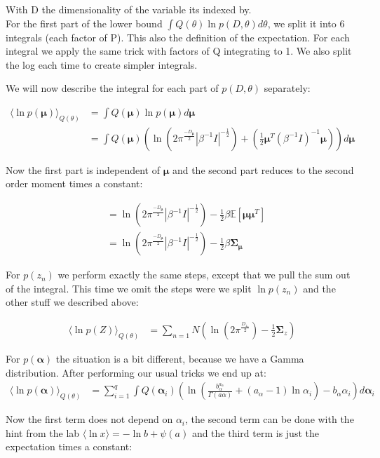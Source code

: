 \documentclass{article}
\def\*#1{\boldsymbol{#1}}
\begin{document}
With D the dimensionality of the variable its indexed by.\\

For the first part of the lower bound $\int Q(\theta) \ln p(D, \theta) d\theta$, we split it into 6 integrals (each factor of P). This also the definition of the expectation. For each integral we apply the same trick with factors of Q integrating to 1. We also split the log each time to create simpler integrals.

We will now describe the integral for each part of $p(D, \theta)$ separately:

\begin{align*}
 \langle \ln p(\*\mu) \rangle_{Q(\theta)} &= \int Q(\*\mu) \ln p(\*\mu) d\*\mu \\
 &= \int Q(\*\mu)(\ln (2\pi^{\frac{-D_{\*\mu}}{2}} |\beta^{-1}I|^{-\frac{1}{2}}) + (\frac12 \*\mu^T(\beta^{-1}I)^{-1}\*\mu )) d\*\mu 
\end{align*}

Now the first part is independent of $\*\mu$ and the second part reduces to the second order moment times a constant:

\begin{align*}
&= \ln (2\pi^{\frac{-D_{\*\mu}}{2}} |\beta^{-1}I|^{-\frac{1}{2}}) - \frac12 \beta \mathbb{E}[\*\mu\*\mu^T] \\
&= \ln (2\pi^{\frac{-D_{\*\mu}}{2}} |\beta^{-1}I|^{-\frac{1}{2}}) - \frac12 \beta \*\Sigma_{\*\mu}
\end{align*}

For $p(z_n)$ we perform exactly the same steps, except that we pull the sum out of the integral. This time we omit the steps were we split $\ln p(z_n)$ and the other stuff we described above:

\begin{align*}
\langle \ln p(Z) \rangle_{Q(\theta)} &= \sum_{n=1}{N} ( \ln(2\pi^{\frac{D_{z_n}}{2}}) - \frac12 \*\Sigma_z)
\end{align*}

For $p(\*\alpha)$ the situation is a bit different, because we have a Gamma distribution. After performing our usual tricks we end up at:
\begin{align*}
\langle \ln p(\*\alpha) \rangle_{Q(\theta)} &= \sum_{i=1}^q \int Q(\*\alpha_i) (\ln (\frac{b_\alpha^{a_\alpha}}{\Gamma(a\alpha)} + (a_\alpha - 1) \ln \alpha_i)  - b_\alpha \alpha_i) d\*\alpha_i
\end{align*}

Now the first term does not depend on $\alpha_i$, the second term can be done with the hint from the lab $\langle \ln x\rangle = - \ln b + \psi(a)$ and the third term is just the expectation times a constant:
\end{document}
